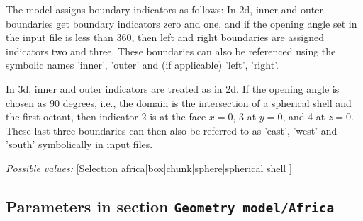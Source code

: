 \begin{itemize}
The model assigns boundary indicators as follows: In 2d, inner and outer boundaries get boundary indicators zero and one, and if the opening angle set in the input file is less than 360, then left and right boundaries are assigned indicators two and three. These boundaries can also be referenced using the symbolic names 'inner', 'outer' and (if applicable) 'left', 'right'.

In 3d, inner and outer indicators are treated as in 2d. If the opening angle is chosen as 90 degrees, i.e., the domain is the intersection of a spherical shell and the first octant, then indicator 2 is at the face $x=0$, 3 at $y=0$, and 4 at $z=0$. These last three boundaries can then also be referred to as 'east', 'west' and 'south' symbolically in input files.


{\it Possible values:} [Selection africa|box|chunk|sphere|spherical shell ]
\end{itemize}



\subsection{Parameters in section \tt Geometry model/Africa}
\label{parameters:Geometry_20model/Africa}

